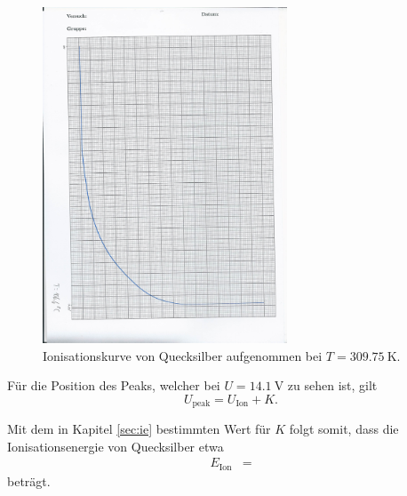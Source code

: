 \begin{figure}[H]
  \centering
  \includegraphics[height = 10cm]{messdaten/daten-5.jpg}
  \caption{Ionisationskurve von Quecksilber aufgenommen bei $T = \SI{309.75}{\kelvin}$.}
  \label{fig:abb2}
\end{figure}

Für die Position des Peaks, welcher bei $U = \SI{14.1}{\volt}$ zu sehen ist, gilt
\begin{equation}
  U_{\text{peak}} = U_{\text{Ion}} + K.
\end{equation}

Mit dem in Kapitel \ref{sec:ie} bestimmten Wert für $K$ folgt somit, dass die Ionisationsenergie von Quecksilber etwa
\begin{align*}
  E_{\text{Ion}} &= 
\end{align*}
beträgt.
